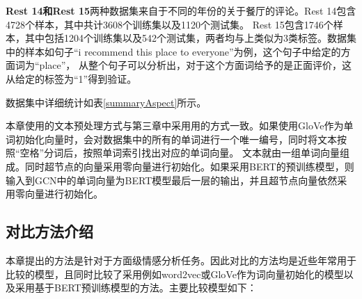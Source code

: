 \textbf{Rest 14和Rest 15}两种数据集来自于不同的年份的关于餐厅的评论。Rest 14包含4728个样本，其中共计3608个训练集以及1120个测试集。
Rest 15包含1746个样本，其中包括1204个训练集以及542个测试集，两者均与上类似为3类标签。数据集中的样本如句子“i recommend this place to everyone”为例，这个句子中给定的方面词为“place”，
从整个句子可以分析出，对于这个方面词给予的是正面评价，这从给定的标签为“1”得到验证。

数据集中详细统计如表\ref{summaryAspect}所示。
\begin{table}[htb]
	\centering
	\caption{数据集数据统计}
\end{table}

本章使用的文本预处理方式与第三章中采用用的方式一致。如果使用GloVe作为单词初始化向量时，会对数据集中的所有的单词进行一个唯一编号，同时将文本按照“空格”分词后，按照单词索引找出对应的单词向量。
文本就由一组单词向量组成。同时超节点的向量采用零向量进行初始化。如果采用BERT的预训练模型，则输入到GCN中的单词向量为BERT模型最后一层的输出，并且超节点向量依然采用零向量进行初始化。

\subsection{对比方法介绍}
本章提出的方法是针对于方面级情感分析任务。因此对比的方法均是近些年常用于比较的模型，且同时比较了采用例如word2vec或GloVe作为词向量初始化的模型以及采用基于BERT预训练模型的方法。主要比较模型如下：

